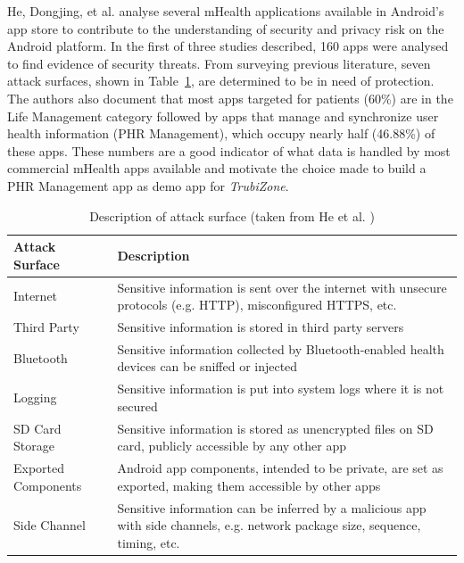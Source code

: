 He, Dongjing, et al. \cite{he2014security} analyse several mHealth applications available in Android's app store to contribute to the understanding of security and privacy risk on the Android platform. In the first of three studies described, 160 apps were analysed to find evidence of security threats. From surveying previous literature, seven attack surfaces, shown in Table~\ref{tab:attacksurfaces}, are determined to be in need of protection.
The authors also document that most apps targeted for patients (60\%) are in the Life Management category followed by apps that manage and synchronize user health information (\ac{PHR} Management), which occupy nearly half (46.88\%) of these apps. These numbers are a good indicator of what data is handled by most commercial mHealth apps available and motivate the choice made to build a \ac{PHR} Management app as demo app for \emph{TrubiZone}.

\begin{table}[t]
	\caption {Description of attack surface (taken from He et al. \cite{he2014security})}
	\label{tab:attacksurfaces}
	\begin{tabular}{|>{\raggedright}p{2cm}|>{\raggedright\arraybackslash}p{10cm}|}
		\hline
		\textbf{Attack Surface}      & \textbf{Description}                                                                                                                    \\ \hline
		Internet            & Sensitive information is sent over the internet with unsecure protocols (e.g. HTTP), misconfigured HTTPS, etc.                 \\ \hline
		Third Party         & Sensitive information is stored in third party servers                                                                         \\ \hline
		Bluetooth           & Sensitive information collected by Bluetooth-enabled health devices can be sniffed or injected                                 \\ \hline
		Logging             & Sensitive information is put into system logs where it is not secured                                                          \\ \hline
		SD Card Storage     & Sensitive information is stored as unencrypted files on SD card, publicly accessible by any other app                          \\ \hline
		Exported Components &  Android app components, intended to be private, are set as exported, making them accessible by other apps                     \\ \hline
		Side Channel        & Sensitive information can be inferred by a malicious app with side channels, e.g. network package size, sequence, timing, etc. \\ \hline
	\end{tabular}
\end{table}

